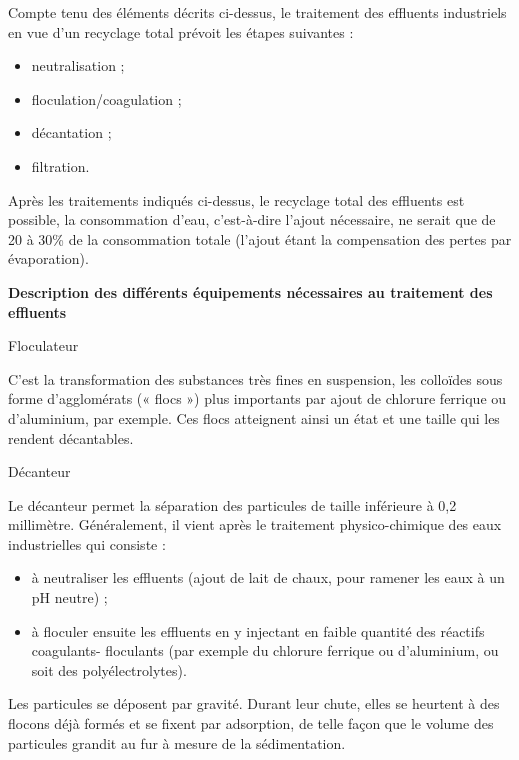 Compte tenu des éléments décrits ci-dessus, le traitement des effluents industriels en vue d’un recyclage total prévoit les étapes suivantes :
\begin{itemize}
\item neutralisation ;
\item floculation/coagulation ;
\item décantation ;
\item filtration.

\end{itemize}

Après les traitements indiqués ci-dessus, le recyclage total des effluents est possible, la consommation d’eau, c’est-à-dire l’ajout nécessaire, ne serait que de 20 à 30\% de la consommation totale (l’ajout étant la compensation des pertes par évaporation).

\vspace{0.3cm}

\textbf{Description des différents équipements nécessaires au traitement des effluents}
\vspace{0.3cm}

Floculateur
\vspace{0.3cm}

C’est la transformation des substances très fines en suspension, les colloïdes sous forme d’agglomérats (« flocs ») plus importants par ajout de chlorure ferrique ou d’aluminium, par exemple. Ces flocs atteignent ainsi un état et une taille qui les rendent décantables.
\vspace{0.3cm}

Décanteur
\vspace{0.3cm}

Le décanteur permet la séparation des particules de taille inférieure à 0,2 millimètre. Généralement, il vient après le traitement physico-chimique des eaux industrielles qui consiste :


\begin{itemize}
\item à neutraliser les effluents (ajout de lait de chaux, pour ramener les eaux à un pH neutre) ;
\item à floculer ensuite les effluents en y injectant en faible quantité des réactifs coagulants-
floculants (par exemple du chlorure ferrique ou d’aluminium, ou soit des polyélectrolytes).

\end{itemize}

Les particules se déposent par gravité. Durant leur chute, elles se heurtent à des flocons déjà formés et se fixent par adsorption, de telle façon que le volume des particules grandit au fur à mesure de la sédimentation.

